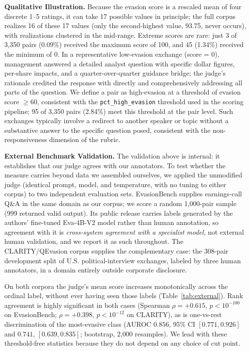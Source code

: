 \documentclass[conference]{IEEEtran}
\begin{document}
\textbf{Qualitative Illustration.} Because the evasion score is a rescaled mean of four discrete 1--5 ratings, it can take 17 possible values in principle; the full corpus realizes 16 of these 17 values (only the second-highest value, 93.75, never occurs), with realizations clustered in the mid-range. Extreme scores are rare: just 3 of 3,350 pairs (0.09\%) received the maximum score of 100, and 45 (1.34\%) received the minimum of 0. In a representative low-evasion exchange (score = 0), management answered a detailed analyst question with specific dollar figures, per-share impacts, and a quarter-over-quarter guidance bridge; the judge's rationale credited the response with directly and comprehensively addressing all parts of the question. We define a pair as high-evasion at a threshold of evasion score $\geq 60$, consistent with the \texttt{pct\_high\_evasion} threshold used in the scoring pipeline; 95 of 3,350 pairs (2.84\%) meet this threshold at the pair level. Such exchanges typically involve a redirect to another speaker or topic without a substantive answer to the specific question posed, consistent with the non-responsiveness dimension of the rubric.

\textbf{External Benchmark Validation.} The validation above is internal: it establishes that our judge agrees with our annotators. To test whether the measure carries beyond data we assembled ourselves, we applied the unmodified judge (identical prompt, model, and temperature, with no tuning to either corpus) to two independent evaluation sets. EvasionBench \cite{ma2026evasionbench} supplies earnings-call Q\&A in the same domain as our corpus; we score a random 1{,}000-pair sample (999 returned valid output). Its public release carries labels generated by the authors' fine-tuned Eva-4B-V2 model rather than human annotation, so agreement with it is \emph{cross-system agreement with a specialist model}, not external human validation, and we report it as such throughout. The CLARITY/QEvasion corpus \cite{thomas2024never} supplies the complementary case: the 308-pair development split of U.S. political-interview exchanges, labeled by three human annotators, in a domain entirely outside corporate disclosure.

On both corpora the judge's mean score increases monotonically across the ordinal label, without ever having seen those labels (Table~\ref{tab:external}). Rank agreement is highly significant in both cases (Spearman $\rho = +0.615$, $p < 10^{-100}$ on EvasionBench; $\rho = +0.398$, $p < 10^{-12}$ on CLARITY), as is one-vs-rest discrimination of the most-evasive class (AUROC $0.856$, 95\% CI $[0.771, 0.926]$ and $0.741$, $[0.639, 0.835]$; bootstrap, 2{,}000 resamples). We lead with these threshold-free statistics because they do not depend on any choice of cut point.
\end{document}
